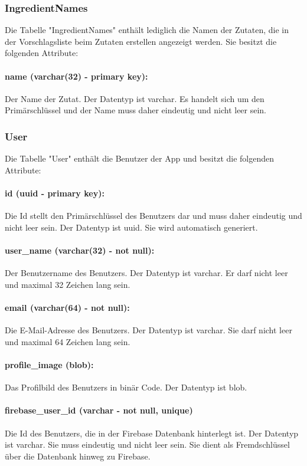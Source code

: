 \documentclass{entwurfsheft}
\begin{document}
\subsubsection{IngredientNames}
Die Tabelle "IngredientNames" enthält lediglich die Namen der Zutaten, die in der Vorschlagsliste beim Zutaten erstellen angezeigt werden. Sie besitzt die folgenden Attribute:
\paragraph{name (varchar(32) - primary key):} Der Name der Zutat. Der Datentyp ist \Gls{varchar}. Es handelt sich um den Primärschlüssel und der Name muss daher eindeutig und nicht leer sein.
\newpage
\subsubsection{User}
Die Tabelle "User" enthält die Benutzer der App und besitzt die folgenden Attribute:
\paragraph{id (uuid - primary key):} Die Id stellt den Primärschlüssel des Benutzers dar und muss daher eindeutig und nicht leer sein. Der Datentyp ist \Gls{uuid}. Sie wird automatisch generiert.
\paragraph{user\_name (varchar(32) - not null):} Der Benutzername des Benutzers. Der Datentyp ist \Gls{varchar}. Er darf nicht leer und maximal 32 Zeichen lang sein.
\paragraph{email (varchar(64) - not null):} Die E-Mail-Adresse des Benutzers. Der Datentyp ist \Gls{varchar}. Sie darf nicht leer und maximal 64 Zeichen lang sein.
\paragraph{profile\_image (blob):} Das Profilbild des Benutzers in binär Code. Der Datentyp ist \Gls{blob}.
\paragraph{firebase\_user\_id (varchar - not null, unique)} Die Id des Benutzers, die in der Firebase Datenbank hinterlegt ist. Der Datentyp ist \Gls{varchar}. Sie muss eindeutig und nicht leer sein. Sie dient als Fremdschlüssel über die Datenbank hinweg zu Firebase.
\newpage
\end{document}
